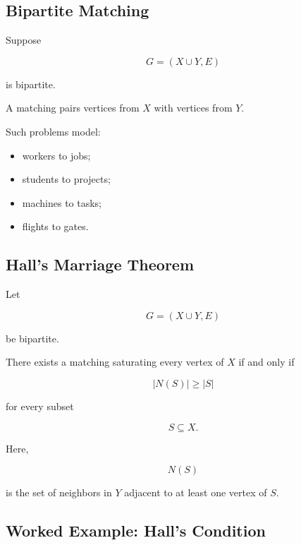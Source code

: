 \subsection{Bipartite Matching}
\label{subsec:bipartite-matching}

Suppose

\[
G=(X\cup Y,E)
\]

is bipartite.

A matching pairs vertices from \(X\) with vertices from \(Y\).

Such problems model:

\begin{itemize}
    \item workers to jobs;
    \item students to projects;
    \item machines to tasks;
    \item flights to gates.
\end{itemize}

\subsection{Hall's Marriage Theorem}
\label{subsec:halls-marriage-theorem}

\begin{theorem}
Let

\[
G=(X\cup Y,E)
\]

be bipartite.

There exists a matching saturating every vertex of \(X\) if and only if

\[
\boxed{
|N(S)|\geq|S|
}
\]

for every subset

\[
S\subseteq X.
\]
\end{theorem}

Here,

\[
N(S)
\]

is the set of neighbors in \(Y\) adjacent to at least one vertex of
\(S\).

\subsection{Worked Example: Hall's Condition}
\label{subsec:worked-hall}

